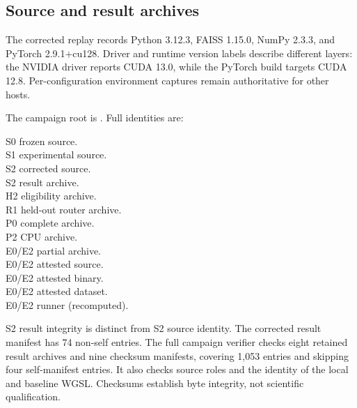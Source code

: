 \subsection{Source and result archives}
The corrected replay records Python 3.12.3, FAISS 1.15.0, NumPy 2.3.3, and PyTorch 2.9.1+cu128. Driver and runtime version labels describe different layers: the NVIDIA driver reports CUDA 13.0, while the PyTorch build targets CUDA 12.8. Per-configuration environment captures remain authoritative for other hosts.

The campaign root is . Full identities are:
\begin{description}
\item[S0 frozen source.] 
\item[S1 experimental source.] 
\item[S2 corrected source.] 
\item[S2 result archive.] 
\item[H2 eligibility archive.] 
\item[R1 held-out router archive.] 
\item[P0 complete archive.] 
\item[P2 CPU archive.] 
\item[E0/E2 partial archive.] 
\item[E0/E2 attested source.] 
\item[E0/E2 attested binary.] 
\item[E0/E2 attested dataset.] 
\item[E0/E2 runner (recomputed).] 
\end{description}
S2 result integrity is distinct from S2 source identity. The corrected result manifest has 74 non-self entries. The full campaign verifier checks eight retained result archives and nine checksum manifests, covering 1,053 entries and skipping four self-manifest entries. It also checks source roles and the identity of the local and baseline WGSL. Checksums establish byte integrity, not scientific qualification.

